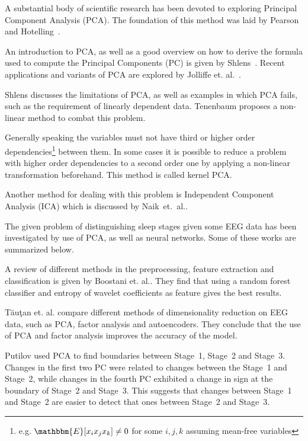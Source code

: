 
A substantial body of scientific research has been devoted to exploring Principal Component Analysis (PCA).
The foundation of this method was laid by Pearson~\cite{Pearson1901} and Hotelling~\cite{Hotelling1933}.

An introduction to PCA, as well as a good overview on how to derive the formula used to compute the Principal Components (PC) is given by Shlens~\cite{Shlens2014}.
Recent applications and variants of PCA are explored by Jolliffe et. al.~\cite{Jolliffe2016}.

Shlens discusses the limitations of PCA, as well as examples in which PCA fails, such as the requirement of linearly dependent data.
Tenenbaum proposes a non-linear method to combat this problem\cite{Tenenbaum2000}.

Generally speaking the variables must not have third or higher order dependencies\footnote{e.g. $\mathbbm{E}[x_ix_jx_k] \neq 0$ for some $i, j, k$ assuming mean-free variables} between them. In some cases it is possible to reduce a problem with higher order dependencies to a second order one by applying a non-linear transformation beforehand. This method is called kernel PCA\cite{Scholkopf1997}.

Another method for dealing with this problem is Independent Component Analysis (ICA) which is discussed by Naik~et.~al.\cite{Naik2011}.


The given problem of distinguishing sleep stages given some EEG data has been investigated by use of PCA, as well as neural networks. Some of these works are summarized below.

A review of different methods in the preprocessing, feature extraction and classification is given by Boostani et. al.\cite{Boostani2017}. They find that using a random forest classifier\cite{Breiman2001} and entropy of wavelet coefficients\cite{Chui1994} as feature gives the best results.

Tăuţan et. al.\cite{Tautan2021} compare different methods of dimensionality reduction on EEG data, such as PCA, factor analysis and autoencoders. They conclude that the use of PCA and factor analysis improves the accuracy of the model.

Putilov\cite{Putilov2015} used PCA to find boundaries between Stage~1, Stage~2 and Stage~3. Changes in the first two PC were related to changes between the Stage~1 and Stage~2, while changes in the fourth PC exhibited a change in sign at the boundary of Stage~2 and Stage~3. This suggests that changes between Stage~1 and Stage~2 are easier to detect that ones between Stage~2 and Stage~3.

